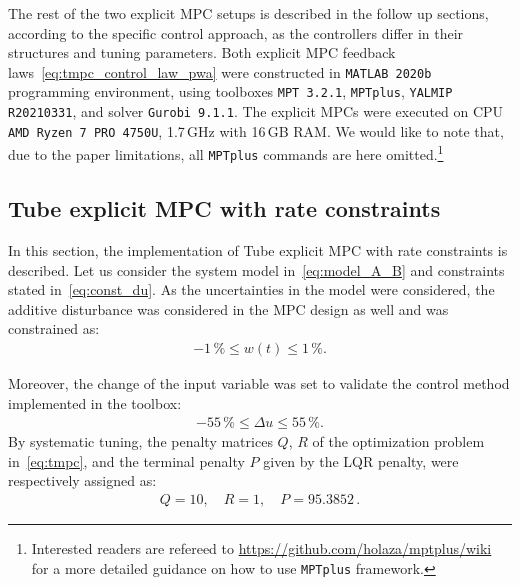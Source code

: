 \documentclass[letterpaper, 10 pt, conference]{ieeeconf}
\begin{document}
The rest of the two explicit MPC setups is described in the follow up sections, according to the specific control approach, as the controllers differ in their structures and tuning parameters. Both explicit MPC feedback laws~\eqref{eq:tmpc_control_law_pwa} were constructed in \texttt{MATLAB 2020b} programming environment, using toolboxes  \texttt{MPT 3.2.1}, \texttt{MPTplus}, \texttt{YALMIP R20210331},
and solver \texttt{Gurobi 9.1.1}. The explicit MPCs were executed on
CPU \texttt{AMD Ryzen 7 PRO 4750U}, 1.7\,GHz with 16\,GB RAM. 
We would like to note that, due to the paper limitations, all \texttt{MPTplus} commands are here omitted.\footnote{Interested readers are refereed to \url{https://github.com/holaza/mptplus/wiki} for a more detailed guidance on how to use \texttt{MPTplus} framework.}



\subsection{Tube explicit MPC with rate constraints}
\label{sec:tube_exp}

In this section, the implementation of Tube explicit MPC with rate constraints is described. Let us consider the system model in~\eqref{eq:model_A_B} and constraints stated in~\eqref{eq:const_du}. 
As the uncertainties in the model were considered, the additive disturbance was considered in the MPC design as well and was constrained as:
\begin{eqnarray}
	\label{eq:const_w}
	-1\,\% \le w(t) \le 1\,\%.
\end{eqnarray}

Moreover, the change of the input variable was set to validate the control method implemented in the toolbox:
\begin{eqnarray}
	\label{eq:const_du}
	-55\,\% \le \Delta u \le 55\,\%.
\end{eqnarray}
By systematic tuning, the penalty matrices $Q$, $R$ of the optimization problem in~\eqref{eq:tmpc}, and the terminal penalty $P$ given by the LQR penalty, were respectively assigned as:
\begin{eqnarray}
\label{eq:setup_penalty}
Q = 10, \quad R = 1, \quad P = 95.3852 \, .
\end{eqnarray}
\end{document}
